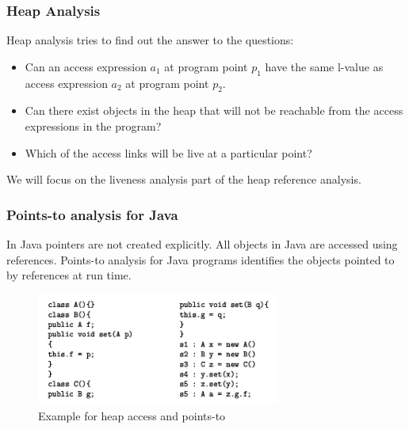 \documentclass{beamer}
\begin{document}
  
  
  
  \begin{frame}
  \frametitle{Heap Analysis}
	Heap analysis tries to find out the answer to the questions: 
	\begin{itemize}
		\item Can an access expression $a_1$ at program point $p_1$ have the same l-value as access expression $a_2$ at program  point $p_2$.
		\item Can there exist objects in the heap that will not be reachable from the access expressions in the program?
		\item Which of the access links will be live at a particular point?
	\end{itemize}
	We will focus on the liveness analysis part of the heap reference analysis.
	\end{frame}
\begin{frame}
\frametitle{Points-to analysis for Java}
	In Java pointers are not created explicitly. All objects in Java are accessed using references. Points-to analysis for Java programs identifies the objects pointed to by references at run time.
	
	\begin{figure}[here]
	\begin{center}
	\includegraphics[width=8cm]{Figures/rsz_heap.png}
	\end{center}
	\caption{Example for heap access and points-to}
	\label{fig:ex1}
	\end{figure}
	
	
	
  \end{frame}
\end{document}
